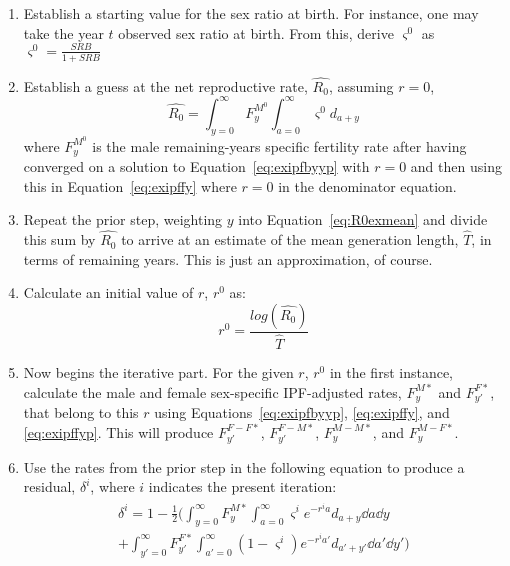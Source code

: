 \begin{enumerate}
  \item Establish a starting value for the sex ratio at birth. For instance, one
  may take the year $t$ observed sex ratio at birth. From this, derive
  $\varsigma^0$ as $\varsigma^0 = \frac{SRB}{1+SRB}$
  \item Establish a guess at the net reproductive rate, $\widehat{R_0}$,
  assuming $r = 0$,
  \begin{equation}
  \label{eq:R0exipf0}
  \widehat{R_0} = \int _{y=0}^\infty F_{y}^{M^0} \int_{a=0}^\infty \varsigma^0
  d_{a+y}
  \end{equation}
  where $F_{y}^{M^0}$ is the male remaining-years specific fertility rate after
  having converged on a solution to Equation~\eqref{eq:exipfbyyp} with $r=0$ and
  then using this in Equation~\eqref{eq:exipffy} where $r=0$ in the denominator
  equation.
  \item Repeat the prior step, weighting $y$ into
  Equation~\eqref{eq:R0exmean} and divide this sum by $\widehat{R_0}$ to arrive at 
  an estimate of the mean generation length, $\widehat{T}$, in terms of
  remaining years. This is just an approximation, of course.
  \item Calculate an initial value of $r$, $r^0$ as:
  \begin{equation}
  r^0 = \frac{log(\widehat{R_0})}{\widehat{T}}
  \end{equation}
  \item Now begins the iterative part. For the given $r$, $r^0$ in the first
  instance, calculate the male and female sex-specific IPF-adjusted rates,
  $F_{y}^{M\ast}$ and $F_{y'}^{F\ast}$, that belong to this $r$ using
  Equations~\eqref{eq:exipfbyyp}, \eqref{eq:exipffy}, and
  \eqref{eq:exipffyp}. This will produce
  $F_{y'}^{F-F\ast}$, $F_{y'}^{F-M\ast}$, $F_{y}^{M-M\ast}$, and
  $F_{y}^{M-F\ast}$.
  \item Use the rates from the prior step in the following equation to produce a
  residual, $\delta^i$, where $i$ indicates the present iteration:
  \begin{align}
  \label{eq:exipfroptimugly}
  \begin{split}
  \delta^i = 1 - \frac{1}{2}\Bigg( \int _{y=0}^\infty F_{y}^{M\ast}
  \int_{a=0}^\infty \varsigma^i e^{-r^ia}d_{a+y} \dd a \dd y \\
  + \int _{y'=0}^\infty F_{y'}^{F\ast} \int_{a'=0}^\infty
(1-\varsigma^i) e^{-r^ia'}d_{a'+y'} \dd a' \dd y'\Bigg)
\end{split}
  \end{align}

\end{enumerate}
